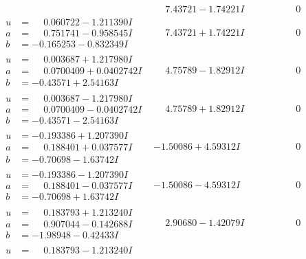 \documentclass[1p]{elsarticle_modified}
\theoremstyle{definition}
\begin{document}
$$\begin{array}{c|c|c}
 & \phantom{-}7.43721 - 1.74221 I & \phantom{-0.000000 } 0 \\ \hline\begin{aligned}
u &= \phantom{-}0.060722 - 1.211390 I \\
a &= \phantom{-}0.751741 - 0.958545 I \\
b &= -0.165253 - 0.832349 I\end{aligned}
 & \phantom{-}7.43721 + 1.74221 I & \phantom{-0.000000 } 0 \\ \hline\begin{aligned}
u &= \phantom{-}0.003687 + 1.217980 I \\
a &= \phantom{-}0.0700409 + 0.0402742 I \\
b &= -0.43571 + 2.54163 I\end{aligned}
 & \phantom{-}4.75789 - 1.82912 I & \phantom{-0.000000 } 0 \\ \hline\begin{aligned}
u &= \phantom{-}0.003687 - 1.217980 I \\
a &= \phantom{-}0.0700409 - 0.0402742 I \\
b &= -0.43571 - 2.54163 I\end{aligned}
 & \phantom{-}4.75789 + 1.82912 I & \phantom{-0.000000 } 0 \\ \hline\begin{aligned}
u &= -0.193386 + 1.207390 I \\
a &= \phantom{-}0.188401 + 0.037577 I \\
b &= -0.70698 - 1.63742 I\end{aligned}
 & -1.50086 + 4.59312 I & \phantom{-0.000000 } 0 \\ \hline\begin{aligned}
u &= -0.193386 - 1.207390 I \\
a &= \phantom{-}0.188401 - 0.037577 I \\
b &= -0.70698 + 1.63742 I\end{aligned}
 & -1.50086 - 4.59312 I & \phantom{-0.000000 } 0 \\ \hline\begin{aligned}
u &= \phantom{-}0.183793 + 1.213240 I \\
a &= \phantom{-}0.907044 - 0.142688 I \\
b &= -1.98948 - 0.42433 I\end{aligned}
 & \phantom{-}2.90680 - 1.42079 I & \phantom{-0.000000 } 0 \\ \hline\begin{aligned}
u &= \phantom{-}0.183793 - 1.213240 I \\

\end{aligned}
\end{array}$$
\end{document}
